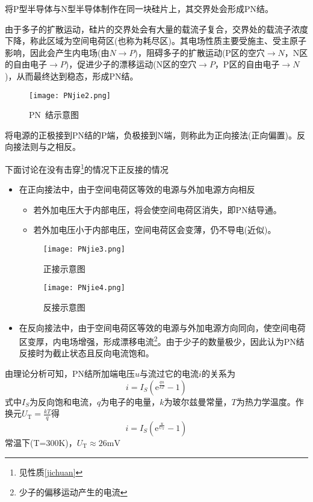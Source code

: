 \documentclass[cn,pad,11pt,geye]{elegantnote}
\begin{document}
\begin{definition}[PN结]
	将P型半导体与N型半导体制作在同一块硅片上，其交界处会形成PN结。\label{kongjian}
\end{definition}
\begin{note}
	由于多子的扩散运动，硅片的交界处会有大量的载流子复合，交界处的载流子浓度下降，称此区域为空间电荷区(也称为耗尽区)。其电场性质主要受施主、受主原子影响，因此会产生内电场(由$N\to P$)，阻碍多子的扩散运动(P区的空穴$\to N$，N区的自由电子$\to P$)，促进少子的漂移运动(N区的空穴$\to P$，P区的自由电子$\to N$)，从而最终达到稳态，形成PN结。
\end{note}
\begin{figure}[h]
	\centering
	\texttt{[image: PNjie2.png]}
	\caption{PN~结示意图}
\end{figure}
\begin{definition}[PN结的正反接]
	将电源的正极接到PN结的P端，负极接到N端，则称此为正向接法(正向偏置)。反向接法则与之相反。
\end{definition}
\begin{proposition}[PN结的单向导电性]
	下面讨论在没有击穿\footnote{见性质\ref{jichuan}}的情况下正反接的情况
	\begin{itemize}
		\item 在正向接法中，由于空间电荷区等效的电源与外加电源方向相反
		\begin{itemize}
			\item 若外加电压大于内部电压，将会使空间电荷区消失，即PN结导通。
			\item 若外加电压小于内部电压，空间电荷区会变薄，仍不导电(近似)。
		\end{itemize}
		\begin{figure}[h]
			\centering
			\texttt{[image: PNjie3.png]}
			\caption{正接示意图}
			\texttt{[image: PNjie4.png]}
			\caption{反接示意图}
		\end{figure}
		\item 在反向接法中，由于空间电荷区等效的电源与外加电源方向同向，使空间电荷区变厚，内电场增强，形成漂移电流\footnote{少子的偏移运动产生的电流}。由于少子的数量极少，因此认为PN结反接时为截止状态且反向电流饱和。
		
	\end{itemize}
\end{proposition}
\begin{theorem}[PN结的电流方程]
	由理论分析可知，PN结所加端电压$u$与流过它的电流$i$的关系为$$i=I_{S}\left(\mathrm{e}^{\frac{qu}{kT}}-1\right)$$
	式中$I_S$为反向饱和电流，$q$为电子的电量，$k$为玻尔兹曼常量，$T$为热力学温度。作换元$U_{\mathrm{T}}=\frac{kT}{q}$得
	$$i=I_{S}\left(\mathrm{e}^{\frac{u}{U_{\mathrm{T}}}}-1\right)$$
	常温下(T=300K)，$U_{\mathrm{T}}\approx26\mathrm{mV}$
\end{theorem}
\end{document}
